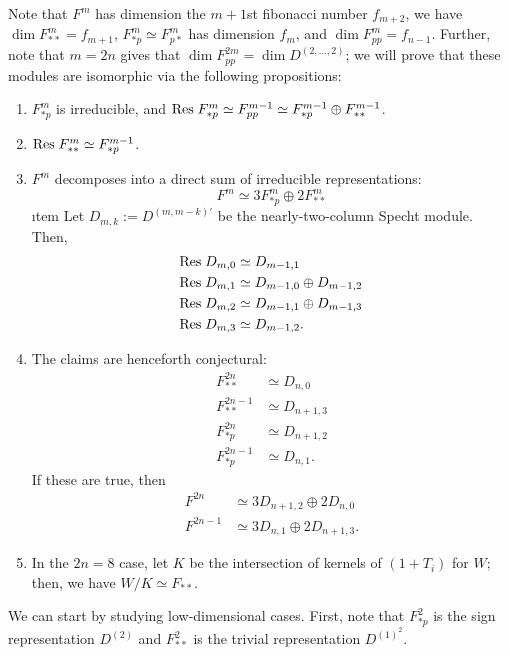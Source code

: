 \documentclass{amsart}
\begin{document}
Note that $F^m$ has dimension the $m + 1$st fibonacci number $f_{m+2}$, we have $\dim F^m_{**} = f_{m+1}$, $F^m_{*p} \simeq F^m_{p*}$ has dimension $f_m$, and $\dim F^m_{pp} = f_{n-1}$.
Further, note that $m = 2n$ gives that $\dim F^{2m}_{pp} = \dim D^{(2,\dots,2)}$;
we will prove that these modules are isomorphic via the following propositions:
\begin{enumerate}
  \item $F^m_{*p}$ is irreducible, and $\text{Res} \; F^m_{*p} \simeq F^{m-1}_{pp} \simeq F^{m-1}_{*p} \oplus F^{m-1}_{**}$.
  \item $\text{Res} \; F^m_{**} \simeq F^{m-1}_{*p}$.
  \item $F^m$ decomposes into a direct sum of irreducible representations:
    \[
      F^m \simeq 3 F^m_{*p} \oplus 2F_{**}^m
    \]
  \i tem Let $D_{m,k} := D^{(m,m-k)'}$ be the nearly-two-column Specht module. Then,
    \begin{align*}
      \text{Res} \; D_{m,0} &\simeq D_{m-1,1}\\
      \text{Res} \; D_{m,1} &\simeq D_{m-1,0} \oplus D_{m-1,2}\\
      \text{Res} \; D_{m,2} &\simeq D_{m-1,1} \oplus D_{m-1,3}\\
      \text{Res} \; D_{m,3} &\simeq D_{m-1,2}.
     \end{align*}
  \item The claims are henceforth conjectural: 
    \begin{align*}
      F^{2n}_{**} &\simeq D_{n,0}\\ 
      F^{2n-1}_{**} &\simeq D_{n+1,3}\\
      F^{2n}_{*p} &\simeq D_{n+1,2}\\
      F^{2n-1}_{*p} &\simeq D_{n,1}.
     \end{align*}
     If these are true, then
     \begin{align*}
        F^{2n} &\simeq 3D_{n+1,2} \oplus 2D_{n,0}\\
        F^{2n-1} &\simeq 3D_{n,1} \oplus 2D_{n+1,3}.
     \end{align*}
   \item In the $2n = 8$ case, let $K$ be the intersection of kernels of $(1 + T_i)$ for $W$;
    then, we have $W/K \simeq F_{**}$.
\end{enumerate}

We can start by studying low-dimensional cases.
First, note that $F_{*p}^2$ is the sign representation $D^{(2)}$ and $F_{**}^2$ is the trivial representation $D^{(1)^2}$.
\end{document}
